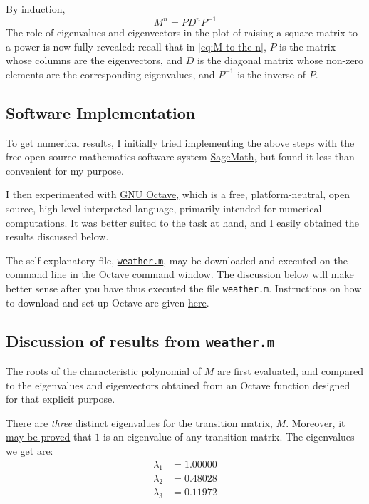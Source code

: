 \documentclass[
  11pt,
  british,
  a4paper,
]{article}
\begin{document}
By induction, \begin{equation}
M^{n} = PD^{n}P^{-1}
\label{eq:M-to-the-n}\end{equation} The role of eigenvalues and
eigenvectors in the plot of raising a square matrix to a power is now
fully revealed: recall that in \cref{eq:M-to-the-n}, \(P\) is the matrix
whose columns are the eigenvectors, and \(D\) is the diagonal matrix
whose non-zero elements are the corresponding eigenvalues, and
\(P^{-1}\) is the inverse of \(P\).

\hypertarget{software-implementation}{%
\subsection{Software Implementation}\label{software-implementation}}

To get numerical results, I initially tried implementing the above steps
with the free open-source mathematics software system
\href{http://www.sagemath.org/}{SageMath,} but found it less than
convenient for my purpose.

I then experimented with \href{https://www.gnu.org/software/octave/}{GNU
Octave,} which is a free, platform-neutral, open source, high-level
interpreted language, primarily intended for numerical computations. It
was better suited to the task at hand, and I easily obtained the results
discussed below.

The self-explanatory file,
\href{auxiliary/weather.m}{\texttt{weather.m}}, may be downloaded and
executed on the command line in the Octave command window. The
discussion below will make better sense after you have thus executed the
file \texttt{weather.m}. Instructions on how to download and set up
Octave are given
\href{https://www.gnu.org/software/octave/download}{here}.

\hypertarget{discussion-of-results-from-weather.m}{%
\subsection{\texorpdfstring{Discussion of results from
\texttt{weather.m}}{Discussion of results from weather.m}}\label{discussion-of-results-from-weather.m}}

The roots of the characteristic polynomial of \(M\) are first evaluated,
and compared to the eigenvalues and eigenvectors obtained from an Octave
function designed for that explicit purpose.

There are \emph{three} distinct eigenvalues for the transition matrix,
\(M\). Moreover,
\href{http://www.math.cornell.edu/~mec/Winter2009/RalucaRemus/Lecture1/lecture1.html}{it
may be proved} that \(1\) is an eigenvalue of any transition matrix. The
eigenvalues we get are: \[
\begin{aligned}
\lambda_{1} &= 1.00000\\
\lambda_{2} &= 0.48028\\
\lambda_{3} &= 0.11972
\end{aligned}
\]
\end{document}
